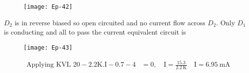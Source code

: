 \begin{enumerate}
	\begin{figure}[H]
		\centering
		\texttt{[image: Ep-42]}
	\end{figure}
	\begin{answer}
		$D_{2}$ is in reverse biased so open circuited and no current flow across $D_{2} .$ Only $D_{1}$ is conducting and all to pass the current equivalent circuit is
		\begin{figure}[H]
			\centering
			\texttt{[image: Ep-43]}
		\end{figure}
		\begin{align*}
		\text { Applying KVL } 20-2.2 \mathrm{K.I}-0.7-4&=0, \quad \mathrm{I}=\frac{15.3}{2.2 \mathrm{~K}} \quad \mathrm{I}=6.95 \mathrm{~mA}
		\end{align*}
	\end{answer}
	
	
	
	
\end{enumerate}